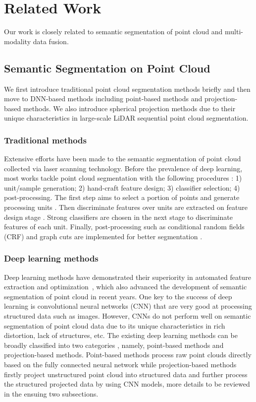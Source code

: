 \documentclass[preprint,review,3p]{elsarticle}
\begin{document}
\section{Related Work}\label{Sec.relatework}
Our work is closely related to semantic segmentation of point cloud and multi-modality data fusion.

\subsection{Semantic Segmentation on Point Cloud}
We first introduce traditional point cloud segmentation methods briefly and then move to DNN-based methods including point-based methods and projection-based methods. We also introduce spherical projection methods due to their unique characteristics in large-scale LiDAR sequential point cloud segmentation.

\subsubsection{Traditional methods}
Extensive efforts have been made to the semantic segmentation of point cloud collected via laser scanning technology. 
Before the prevalence of deep learning, most works tackle point cloud segmentation with the following procedures \cite{xiang2019novel}:
1) unit/sample generation; 2) hand-craft feature design; 3) classifier selection; 4) post-processing. The first step aims to select a portion of points and generate processing units \cite{guo2011relevance,weinmann2014semantic,lehtomaki2015object,zhang2013svm,xu2014multiple}. Then discriminate features over units are extracted on feature design stage \cite{lehtomaki2015object,kumar2019feature,hackel2016fast}. Strong classifiers are chosen in the next stage to discriminate features of each unit\cite{zhang2013svm,zhou2012super}. Finally, post-processing such as conditional random fields (CRF) and graph cuts are implemented for better segmentation \cite{landrieu2017structured,niemeyer2013classification,guo2015classification}. 

\subsubsection{Deep learning methods}
Deep learning methods have demonstrated their superiority in automated feature extraction and optimization~\cite{lecun2015deep}, which also advanced the development of semantic segmentation of point cloud in recent years. One key to the success of deep learning is convolutional neural networks (CNN) that are very good at processing structured data such as images. 
However, CNNs do not perform well on semantic segmentation of point cloud data due to its unique characteristics in rich distortion, lack of structures, etc.  The existing deep learning methods can be broadly classified into two categories \cite{guo2020deep}, namely, point-based methods and projection-based methods.
Point-based methods process raw point clouds directly based on the fully connected neural network while projection-based methods firstly project unstructured point cloud into structured data and further process the structured projected data by using CNN models, 
more details to be reviewed in the ensuing two subsections.
\end{document}
